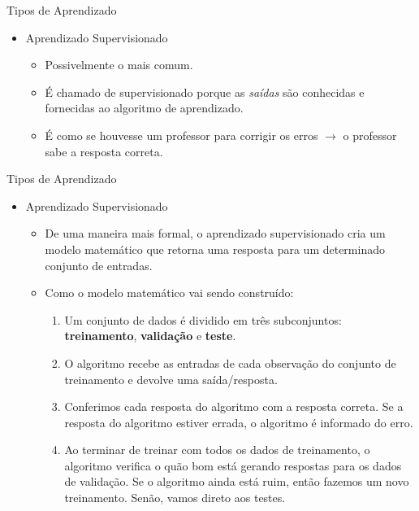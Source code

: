 \documentclass{libs/ufc_format}
\begin{document}
\begin{frame}{Tipos de Aprendizado}
    \begin{itemize}
        \item Aprendizado Supervisionado
            \begin{itemize}
                \justifying
                \item Possivelmente o mais comum.
                \item É chamado de supervisionado porque as \textit{saídas} são conhecidas e fornecidas ao algoritmo de aprendizado.
                \item É como se houvesse um professor para corrigir os erros $\rightarrow$ o professor sabe a resposta correta.
            \end{itemize}
    \end{itemize}
\end{frame}

\begin{frame}{Tipos de Aprendizado}
    \begin{itemize}
        \item Aprendizado Supervisionado
            \begin{itemize}
                \justifying
                \item De uma maneira mais formal, o aprendizado supervisionado cria um modelo matemático que retorna uma resposta para um determinado conjunto de entradas.
                \item Como o modelo matemático vai sendo construído:
                    \begin{enumerate}
                        \justifying
                        \item<2> Um conjunto de dados é dividido em três subconjuntos: \textbf{treinamento}, \textbf{validação} e \textbf{teste}.
                        \item<3> O algoritmo recebe as entradas de cada observação do conjunto de treinamento e devolve uma saída/resposta.
                        \item<4> Conferimos cada resposta do algoritmo com a resposta correta. Se a resposta do algoritmo estiver errada, o algoritmo é informado do erro.
                        \item<5> Ao terminar de treinar com todos os dados de treinamento, o algoritmo verifica o quão bom está gerando respostas para os dados de validação. Se o algoritmo ainda está ruim, então fazemos um novo treinamento. Senão, vamos direto aos testes.
                    \end{enumerate}
            \end{itemize}
    \end{itemize}
\end{frame}
\end{document}
